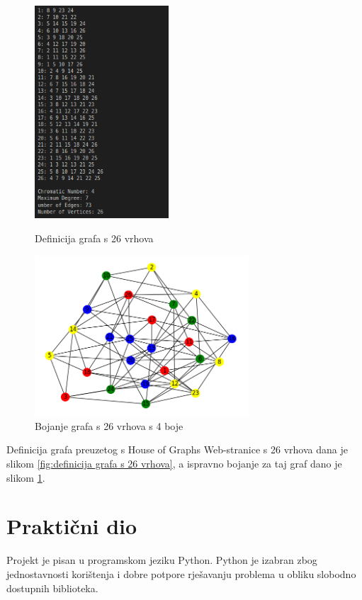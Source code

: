 \documentclass[times, utf8, zavrsni, numeric]{fer}
\begin{document}
\begin{figure}[h]
\centering
\begin{minipage}{.5\textwidth}
  \centering
  \includegraphics[width=5cm]{images/26_vertices_graph_definition.png}
  \caption{Definicija grafa s 26 vrhova}
  \label{fig:definicija grafa s 26 vrhova}
\end{minipage}%
\begin{minipage}{.5\textwidth}
  \centering
  \includegraphics[width=8cm]{images/26_vertices_graph.png}
  \caption{Bojanje grafa s 26 vrhova s 4 boje}
  \label{fig:obojani graf s 26 vrhova}
\end{minipage}
\end{figure}

Definicija grafa preuzetog s House of Graphs Web-stranice s 26 vrhova dana je slikom \ref{fig:definicija grafa s 26 vrhova}, a ispravno bojanje za taj graf dano je slikom \ref{fig:obojani graf s 26 vrhova}.


\chapter{Praktični dio}
Projekt je pisan u programskom jeziku Python. Python je izabran zbog jednostavnosti korištenja i dobre potpore rješavanju problema u obliku slobodno dostupnih biblioteka.
\end{document}
